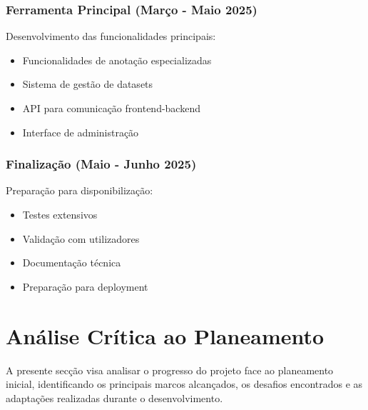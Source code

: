 \subsubsection{Ferramenta Principal (Março - Maio 2025)}
Desenvolvimento das funcionalidades principais:
\begin{itemize}
    \item Funcionalidades de anotação especializadas
    \item Sistema de gestão de datasets
    \item API para comunicação frontend-backend
    \item Interface de administração
\end{itemize}

\subsubsection{Finalização (Maio - Junho 2025)}
Preparação para disponibilização:
\begin{itemize}
    \item Testes extensivos
    \item Validação com utilizadores
    \item Documentação técnica
    \item Preparação para deployment
\end{itemize}

\section{Análise Crítica ao Planeamento}

A presente secção visa analisar o progresso do projeto face ao planeamento inicial, identificando os principais marcos alcançados, os desafios encontrados e as adaptações realizadas durante o desenvolvimento.

